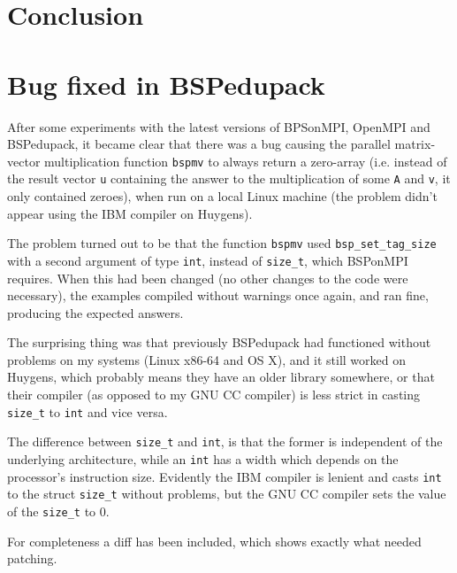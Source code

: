 \documentclass[a4paper]{article}
\begin{document}
\section{Conclusion}


\appendix
\clearpage
\section{Bug fixed in BSPedupack}

After some experiments with the latest versions of BPSonMPI, OpenMPI and
BSPedupack, it became clear that there was a bug causing the parallel matrix-vector
multiplication function
\texttt{bspmv} to always return a zero-array (i.e. instead of the result vector
\texttt{u} containing the answer to the multiplication of some \texttt{A} and
\texttt{v}, it only contained zeroes), when run on a local Linux machine (the
problem didn't appear using the IBM compiler on Huygens).

The problem turned out to be that the function \texttt{bspmv} used
\texttt{bsp\_set\_tag\_size} with a second argument of type \texttt{int},
instead of \texttt{size\_t}, which BSPonMPI requires. When this had been
changed (no other changes to the code were necessary), the examples compiled
without warnings once again, and ran fine, producing the expected answers.

The surprising thing was that previously BSPedupack had functioned without
problems on my systems (Linux x86-64 and OS X), and it still worked on Huygens,
which probably means they have an older library somewhere, or that their
compiler (as opposed to my GNU CC compiler) is less strict in casting \texttt{size\_t} to \texttt{int} and vice versa.

The difference between \texttt{size\_t} and \texttt{int}, is that the former is
independent of the underlying architecture, while an \texttt{int} has a width
which depends on the processor's instruction size. Evidently the IBM compiler
is lenient and casts \texttt{int} to the struct \texttt{size\_t} without
problems, but the GNU CC compiler sets the value of the \texttt{size\_t} to 0.

For completeness a diff has been included, which shows exactly what needed patching.

\end{document}
